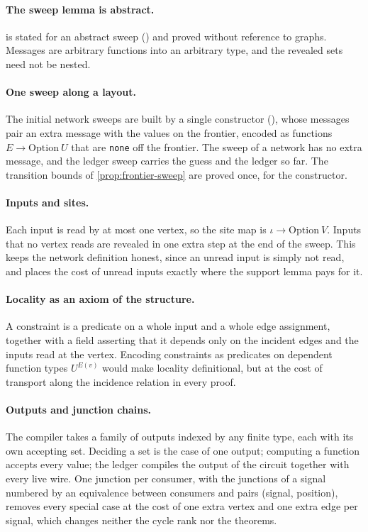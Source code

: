 \documentclass[11pt]{article}
\theoremstyle{plain}
\theoremstyle{definition}
\theoremstyle{remark}
\begin{document}
\paragraph{The sweep lemma is abstract.}
 is stated for an abstract sweep () and proved without
reference to graphs. Messages are arbitrary functions into an arbitrary type, and the revealed
sets need not be nested.

\paragraph{One sweep along a layout.}
The initial network sweeps are built by a single constructor
(), whose messages pair an extra message with the values on
the frontier, encoded as functions $E \to \mathrm{Option}\ U$ that are \texttt{none} off the
frontier. The sweep of a network has no extra message, and the ledger sweep carries the guess
and the ledger so far. The transition bounds of \cref{prop:frontier-sweep} are proved once, for
the constructor.

\paragraph{Inputs and sites.}
Each input is read by at most one vertex, so the site map is
$\iota \to \mathrm{Option}\ V$. Inputs that no vertex reads are revealed in one extra step at
the end of the sweep. This keeps the network definition honest, since an unread input is
simply not read, and places the cost of unread inputs exactly where the support lemma pays for
it.

\paragraph{Locality as an axiom of the structure.}
A constraint is a predicate on a whole input and a whole edge assignment, together with a
field asserting that it depends only on the incident edges and the inputs read at the vertex.
Encoding constraints as predicates on dependent function types $U^{E(v)}$ would make locality
definitional, but at the cost of transport along the incidence relation in every proof.

\paragraph{Outputs and junction chains.}
The compiler takes a family of outputs indexed by any finite type, each with its own accepting
set. Deciding a set is the case of one output; computing a function accepts every value; the
ledger compiles the output of the circuit together with every live wire. One junction per consumer,
with the junctions of a signal numbered by an equivalence between consumers and pairs (signal,
position), removes every special case at the cost of one extra vertex and one extra edge per
signal, which changes neither the cycle rank nor the theorems.
\end{document}
